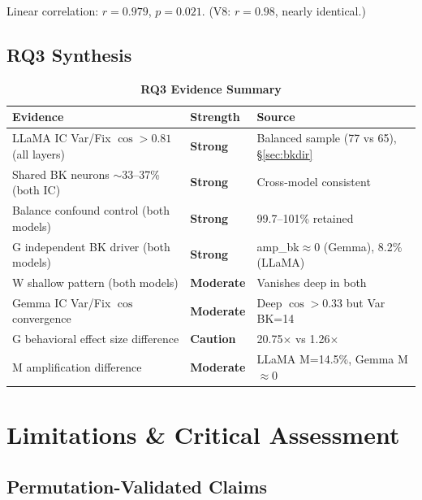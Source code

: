 \documentclass[11pt,a4paper]{article}
\begin{document}
\noindent Linear correlation: $r=0.979$, $p=0.021$. (V8: $r=0.98$, nearly identical.)

\subsection{RQ3 Synthesis}

\begin{table}[H]
\centering
\caption*{\textbf{RQ3 Evidence Summary}}
\footnotesize
\begin{tabular}{lll}
\toprule
Evidence & Strength & Source \\
\midrule
LLaMA IC Var/Fix $\cos>0.81$ (all layers) & \textbf{Strong} & Balanced sample (77 vs 65), \S\ref{sec:bkdir} \\
Shared BK neurons $\sim$33--37\% (both IC) & \textbf{Strong} & Cross-model consistent \\
Balance confound control (both models) & \textbf{Strong} & 99.7--101\% retained \\
G independent BK driver (both models) & \textbf{Strong} & amp\_bk$\approx$0 (Gemma), 8.2\% (LLaMA) \\
W shallow pattern (both models) & \textbf{Moderate} & Vanishes deep in both \\
Gemma IC Var/Fix $\cos$ convergence & \textbf{Moderate} & Deep $\cos>0.33$ but Var BK=14 \\
G behavioral effect size difference & \textbf{Caution} & 20.75$\times$ vs 1.26$\times$ \\
M amplification difference & \textbf{Moderate} & LLaMA M=14.5\%, Gemma M$\approx$0 \\
\bottomrule
\end{tabular}
\end{table}

\section{Limitations \& Critical Assessment}

\subsection{Permutation-Validated Claims}
\end{document}
